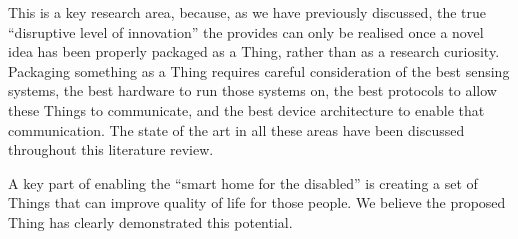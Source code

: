 \documentclass[../thesis/thesis.tex]{subfiles}
\begin{document}
This is a key research area, because, as we have previously discussed, the true ``disruptive level of innovation''\cite{atzori2010internet} the \iot provides can only be realised once a novel idea has been properly packaged as a Thing, rather than as a research curiosity. Packaging something as a Thing requires careful consideration of the best sensing systems, the best hardware to run those systems on, the best protocols to allow these Things to communicate, and the best device architecture to enable that communication. The state of the art in all these areas have been discussed throughout this literature review.

A key part of enabling the ``smart home for the disabled'' is creating a set of Things that can improve quality of life for those people. We believe the proposed Thing has clearly demonstrated this potential.


\end{document}
